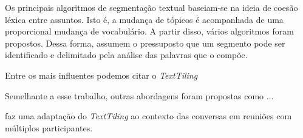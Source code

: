 
Os principais algoritmos de segmentação textual baseiam-se na ideia de coesão léxica entre assuntos. Isto é, a mudança de tópicos é acompanhada de uma proporcional mudança de vocabulário. A partir disso, vários algoritmos foram propostos. Dessa forma, assumem o pressuposto que um segmento pode ser identificado e delimitado pela análise das palavras que o compõe.








 
 










	
%



Entre os mais influentes podemos citar o \textit{TextTiling}~\cite{Hearst1994} 




Semelhante a esse trabalho, outras abordagens foram propostas como ...

\cite{Banerjee200657} faz uma adaptação do \textit{TextTiling} ao contexto das conversas em reuniões com múltiplos participantes.  




